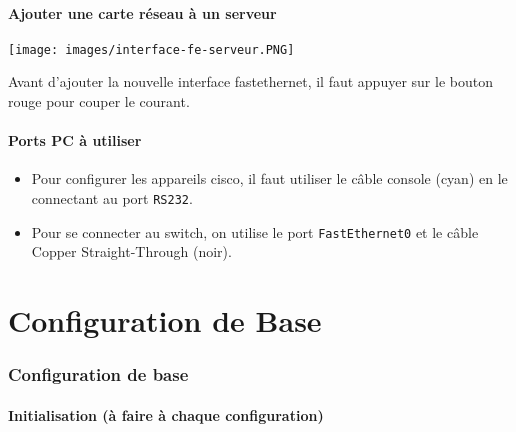 \documentclass[a4paper]{article}
\begin{document}
\subsection{Ajouter une carte réseau à un serveur}



\begin{center}
    \texttt{[image: images/interface-fe-serveur.PNG]}
\end{center}
Avant d'ajouter la nouvelle interface fastethernet, il faut appuyer sur le bouton rouge pour couper le courant.





\subsection{Ports PC à utiliser}



\begin{itemize}
    \item Pour configurer les appareils cisco, il faut utiliser le câble console (cyan) en le connectant au port \texttt{RS232}.
    \item Pour se connecter au switch, on utilise le port \texttt{FastEthernet0} et le câble Copper Straight-Through (noir).
\end{itemize}















\part{Configuration de Base}










\section{Configuration de base}





\subsection{Initialisation (à faire à chaque configuration)}
\end{document}

